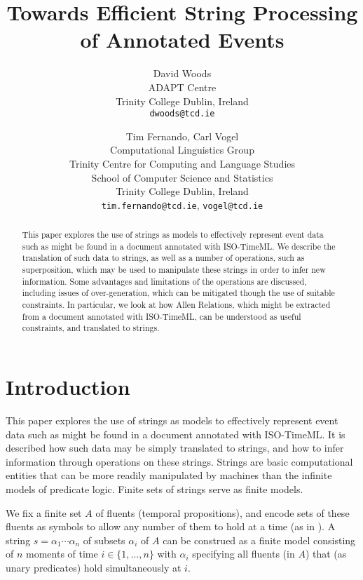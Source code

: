 \documentclass[a4paper,11pt,leqno]{article}
\title{Towards Efficient String Processing of Annotated Events}
\date{}
\author{David Woods\\
	ADAPT Centre\\
	Trinity College Dublin, Ireland\\
	\texttt{dwoods@tcd.ie}
	\and Tim Fernando, Carl Vogel\\
	Computational Linguistics Group \\
	Trinity Centre for Computing and Language Studies\\
	School of Computer Science and Statistics\\
	Trinity College Dublin, Ireland\\
	\texttt{tim.fernando@tcd.ie}, \texttt{vogel@tcd.ie}
}
\begin{document}
\maketitle
\thispagestyle{empty}
\pagestyle{empty}
\begin{abstract}
\noindent
This paper explores the use of strings as models to effectively represent event 
data such as might be found in a document annotated with ISO-TimeML. We 
describe the translation of such data to strings, as well as a number of 
operations, such as superposition, which may be used to manipulate these 
strings in order to infer new information. Some advantages and limitations of 
the operations are discussed, including issues of over-generation, which can be 
mitigated though the use of suitable constraints. In particular, we look at how 
Allen Relations, which might be extracted from a document annotated with 
ISO-TimeML, can be understood as useful constraints, and translated to strings.
\end{abstract}
\section{Introduction}\label{intro}
This paper explores the use of strings as models to effectively represent event 
data such as might be found in a document annotated with ISO-TimeML. It is 
described how such data may be simply translated to strings, and how to infer 
information through operations on these strings. Strings are basic 
computational entities that can be more readily manipulated by machines than 
the infinite models of predicate logic. Finite sets of strings serve as finite 
models.

We fix a finite set $A$ of fluents (temporal propositions), 
and encode sets of these fluents as symbols to allow any number of them to hold 
at a time (as in \citealp{fernando2016regular}). A string $s=\alpha_1 \cdots 
\alpha_n$ of subsets $\alpha_i$ of $A$ can be construed as a finite model 
consisting of $n$ moments of time $i \in \{1, \ldots, n\}$ with $\alpha_i$ 
specifying all fluents (in $A$) that (as unary predicates) hold simultaneously 
at $i$.
\end{document}
